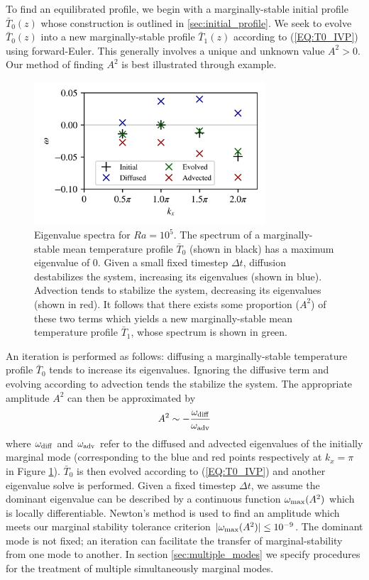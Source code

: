 \documentclass[reprint,amsmath,amssymb,aps]{revtex4-1}
\begin{document}
To find an equilibrated profile, we begin with a marginally-stable initial profile $\bar{T}_0(z)$ whose construction is outlined in \ref{sec:initial_profile}. 
We seek to evolve $\bar{T}_0(z)$ into a new marginally-stable profile $\bar{T}_1(z)$ according to (\ref{EQ:T0_IVP}) using forward-Euler. 
This generally involves a unique and unknown value $A^2 > 0$. 
Our method of finding $A^2$ is best illustrated through example.

\begin{figure}
    \includegraphics[width=3.4in]{EV_spectrum_ol.png}
    \caption{Eigenvalue spectra for $Ra = 10^5$. The spectrum of a marginally-stable mean temperature profile $\bar{T}_0$ (shown in black) has a maximum eigenvalue of 0. 
    Given a small fixed timestep $\Delta t$, diffusion destabilizes the system, increasing its eigenvalues (shown in blue). 
    Advection tends to stabilize the system, decreasing its eigenvalues (shown in red). 
    It follows that there exists some proportion ($A^2$) of these two terms which yields a new marginally-stable mean temperature profile $\bar{T}_1$, whose spectrum is shown in green.}
    \label{fig:iteration_spectra} 
\end{figure}

An iteration is performed as follows: diffusing a marginally-stable temperature profile $\bar{T}_0$ tends to increase its eigenvalues. 
Ignoring the diffusive term and evolving according to advection tends the stabilize the system. The appropriate amplitude $A^2$ can then be approximated by
\begin{equation}
    A^2 \sim -\frac{\omega_{\rm{diff}}}{\omega_{\rm{adv}}}
\end{equation}
where $\omega_{\rm{diff}}$ and $\omega_{\rm{adv}}$ refer to the diffused and advected eigenvalues of the initially marginal mode (corresponding to the blue and red points respectively at $k_x = \pi$ in Figure \ref{fig:iteration_spectra}). 
$\bar{T}_0$ is then evolved according to (\ref{EQ:T0_IVP}) and another eigenvalue solve is performed. 
Given a fixed timestep $\Delta t$, we assume the dominant eigenvalue can be described by a continuous function $\omega_{\rm{max}} (A^2)$ which is locally differentiable. 
Newton's method is used to find an amplitude which meets our marginal stability tolerance criterion $|\omega_{\rm{max}} (A^2)| \leq 10^{-9}$. 
The dominant mode is not fixed; an iteration can facilitate the transfer of marginal-stability from one mode to another. 
In section \ref{sec:multiple_modes} we specify procedures for the treatment of multiple simultaneously marginal modes.
\end{document}
